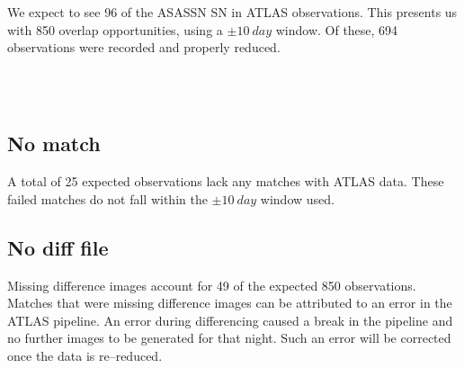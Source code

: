 \documentclass[aps,prb,twocolumn,superscriptaddress]{revtex4-1}
\begin{document}
We expect to see 96 of the ASASSN SN in ATLAS observations. 
This presents us with 850 overlap opportunities, using a 
$\pm10~day$ window. Of these, 694 observations were recorded 
and properly reduced. %

\\
\\


\subsection{No match}
A total of 25 expected observations lack any matches with ATLAS data. These failed 
matches do not fall within the $\pm10~day$ window used.


\subsection{No diff file}
\indent Missing difference images account for 49 of the expected 850 observations. 
Matches that were missing difference images can be attributed to an error in the 
ATLAS pipeline. An error during differencing caused a break in the pipeline and no 
further images to be generated for that night. Such an error will be corrected once 
the data is re--reduced.
\end{document}
